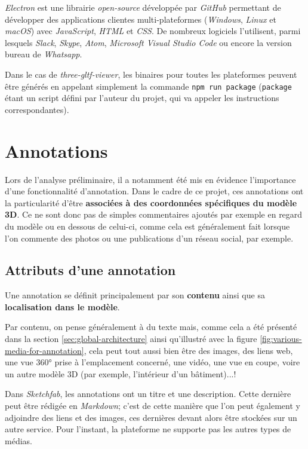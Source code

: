 \textit{Electron} est une librairie \textit{open-source} développée par \textit{GitHub} permettant de développer des applications clientes multi-plateformes (\textit{Windows}, \textit{Linux} et \textit{macOS}) avec \textit{JavaScript}, \textit{HTML} et \textit{CSS}. De nombreux logiciels l'utilisent, parmi lesquels \textit{Slack}, \textit{Skype}, \textit{Atom}, \textit{Microsoft Visual Studio Code} ou encore la version bureau de \textit{Whatsapp}. 

Dans le cas de \textit{three-gltf-viewer}, les binaires pour toutes les plateformes peuvent être générés en appelant simplement la commande \texttt{npm run package} (\texttt{package} étant un script défini par l'auteur du projet, qui va appeler les instructions correspondantes).

\section{Annotations}

Lors de l'analyse préliminaire, il a notamment été mis en évidence l'importance d'une fonctionnalité d'annotation. Dans le cadre de ce projet, ces annotations ont la particularité d'être \textbf{associées à des coordonnées spécifiques du modèle 3D}. Ce ne sont donc pas de simples commentaires ajoutés par exemple en regard du modèle ou en dessous de celui-ci, comme cela est généralement fait lorsque l'on commente des photos ou une publications d'un réseau social, par exemple.

\subsection{Attributs d'une annotation}

Une annotation se définit principalement par son \textbf{contenu} ainsi que sa \textbf{localisation dans le modèle}.

Par contenu, on pense généralement à du texte mais, comme cela a été présenté dans la section \ref{sec:global-architecture} ainsi qu'illustré avec la figure \ref{fig:various-media-for-annotation}, cela peut tout aussi bien être des images, des liens web, une vue 360° prise à l'emplacement concerné, une vidéo, une vue en coupe, voire un autre modèle 3D (par exemple, l'intérieur d'un bâtiment)...!

Dans \textit{Sketchfab}, les annotations ont un titre et une description. Cette dernière peut être rédigée en \textit{Markdown}; c'est de cette manière que l'on peut également y adjoindre des liens et des images, ces dernières devant alors être stockées sur un autre service.
Pour l'instant, la plateforme ne supporte pas les autres types de médias.

